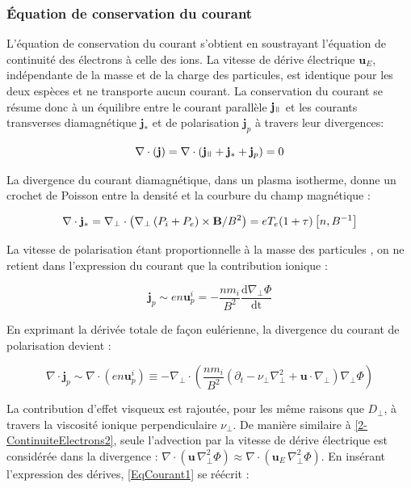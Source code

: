\begin{refsection}
\subsubsection{Équation de conservation du courant}
L'équation de conservation du courant s'obtient en soustrayant l'équation de
continuité des électrons à celle des ions. La vitesse de dérive électrique
$\mathbf{u}_E$, indépendante de la masse et de la charge des particules,
est identique pour les deux espèces et ne transporte aucun courant. 
La conservation du courant se résume donc à un équilibre entre le courant
parallèle $\mathbf{j}_\para$ et les courants transverses diamagnétique
$\mathbf{j}_*$ et de polarisation $\mathbf{j}_p$ à travers leur
divergences:

\begin{equation}
\label{EqCourant1}
\nabla\cdot\left(\mathbf{j}\right) = 
\nabla\cdot\left(\mathbf{j}_\para+\mathbf{j}_*+\mathbf{j}_p\right)
= 0
\end{equation}

La divergence du courant diamagnétique, dans un plasma isotherme, donne un
crochet de Poisson entre la densité et la courbure du champ magnétique :

\begin{equation}
\nabla\cdot\mathbf{j}_*=
\nabla_\perp\cdot\left(\nabla_\perp\left(
P_i+P_e\right)\times\mathbf{B}/B^2\right) =
eT_e(1+\tau)\left[n,B^{{-1}}\right]
\end{equation}

La vitesse de polarisation étant
proportionnelle à la masse des particules , on ne
retient dans l'expression du courant que la contribution ionique :

\begin{equation}
\mathbf{j}_p\sim
en\mathbf{u}^i_p=-\frac{nm_{i}}{B^2}\frac{\text{d}\nabla_\perp \Phi}{\text{dt}}
\end{equation}

En exprimant la dérivée totale de
façon eulérienne, la divergence du courant de polarisation devient :

\begin{equation}
\nabla\cdot\mathbf{j}_p\sim\nabla\cdot\left({e}n\mathbf{u}^i_p\right)\equiv
-\nabla_\perp\cdot\left(\frac{nm_{i}}{B^2}\left(\partial_{t} -
\nu_\perp \nabla_\perp^2 +
\mathbf{u}\cdot\nabla_\perp\right)\nabla_\perp \Phi\right)
\end{equation}

La contribution d'effet visqueux est rajoutée, pour les même raisons que
$D_\perp$, à travers la viscosité ionique perpendiculaire $\nu_\perp$.
De manière similaire à \eqref{2-ContinuiteElectrons2}, seule l'advection par la
vitesse de dérive électrique est considérée dans la divergence : 
$\nabla\cdot\left(\mathbf{u}\,\nabla_\perp^2 \Phi\right)
\approx\nabla\cdot\left(\mathbf{u}_E\,\nabla_\perp^2 \Phi\right)$.
En insérant l'expression des dérives, \eqref{EqCourant1} se réécrit :


\end{refsection}
